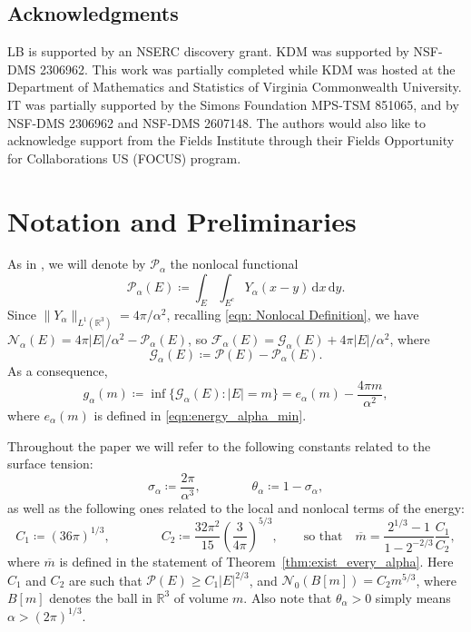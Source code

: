 \documentclass[a4paper,11pt,reqno]{amsart}
\numberwithin{equation}{section}
\theoremstyle{remark}
\theoremstyle{definition}
\renewcommand{\bar}[1]{\overline{#1}}
\newcommand{\R}{\mathbb R}
\newcommand{\dd}{\,\mathrm{d}}
\newcommand{\defeq}{\coloneqq}
\newcommand{\enf}{\mathcal{F}_{\alpha}}
\newcommand{\eng}{\mathcal{G}_{\alpha}}
\newcommand{\nl}{\mathcal{N}_{\alpha}}
\renewcommand{\geq}{\geqslant}
\newcommand{\calP}{\mathcal{P}}
\newcommand{\calN}{\mathcal{N}}
\newcommand{\Pe}{\mathcal{P}}
\begin{document}
 \subsection*{Acknowledgments}
LB is supported by an NSERC discovery grant. KDM was supported by NSF-DMS 2306962. This work was partially completed while KDM was hosted at the Department of Mathematics and Statistics of Virginia Commonwealth University. IT was partially supported by the Simons Foundation MPS-TSM 851065, and by NSF-DMS 2306962 and NSF-DMS 2607148. The authors would also like to acknowledge support from the Fields Institute through their Fields Opportunity for Collaborations US (FOCUS) program.


\section{Notation and Preliminaries}\label{sec:notation_prelim}

As in \cite{Peg}, we will denote by $\calP_\alpha$ the nonlocal functional
	\[
		\calP_\alpha(E) \defeq \int_E \int_{E^c} Y_\alpha(x-y)\dd x \dd y.
	\]
Since $\| Y_\alpha\|_{L^1(\R^3)}=4\pi/\alpha^2$, recalling \eqref{eqn: Nonlocal Definition}, we have $\nl(E)=4\pi|E|/\alpha^2-\calP_\alpha(E)$, so $\enf(E)=\eng(E)+4\pi|E|/\alpha^2$, where
	\[
		\eng(E)\defeq \Pe(E)-\calP_\alpha(E).
	\]
As a consequence,
	\[
		g_\alpha(m) \defeq \inf \Big\{ \eng(E) \colon |E|=m \Big\} = e_\alpha(m) - \frac{4\pi m}{\alpha^2},
	\]
where $e_\alpha(m)$ is defined in \eqref{eqn:energy_alpha_min}.

Throughout the paper we will refer to the following constants related to the surface tension: 
	\[
		\sigma_\alpha\defeq \frac{2\pi}{\alpha^3}, \qquad\qquad \theta_\alpha \defeq 1-\sigma_\alpha,
	\]
as well as the following ones related to the local and nonlocal terms of the energy:
	\begin{equation}\label{eqn:constants}
		C_1 \defeq (36\pi)^{1/3}, \qquad\qquad C_2 \defeq \frac{32\pi^2}{15}\left(\frac{3}{4\pi}\right)^{5/3}, \qquad \text{so that}\quad \bar{m}= \frac{2^{1/3}-1}{1-2^{-2/3}}\frac{C_1}{C_2},
	\end{equation}	
where $\bar{m}$ is defined in the statement of Theorem~\ref{thm:exist_every_alpha}.
Here $C_1$ and $C_2$ are such that $\Pe(E)\geq C_1 |E|^{2/3}$, and $\calN_0(B[m])=C_2m^{5/3}$, where $B[m]$ denotes the ball in $\R^3$ of volume $m$. Also note that $\theta_\alpha>0$ simply means $\alpha>(2\pi)^{1/3}$.
\end{document}
